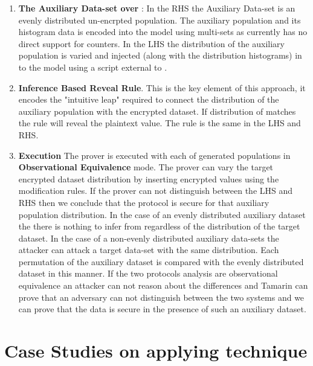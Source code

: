 \documentclass[journal]{IEEEtran}
\begin{document}
\begin{enumerate}[label=(\Alph*)]
\item \textbf{The Auxiliary Data-set \aux{} over \auxSpace}:
In the RHS the Auxiliary Data-set \auxsecure{} is an evenly distributed un-encrpted population.  The auxiliary population and its histogram data is encoded into the model using \tamarin{} multi-sets as \tamarin{} currently has no direct support for counters. 
In the LHS the distribution of the auxiliary population is varied and injected (along with the distribution histograms) in to the model using a script external to \tamarin{}.
\item\textbf{ Inference Based Reveal Rule}. This is the key element of this approach, it encodes the "intuitive leap" required to connect the distribution of the auxiliary population with the encrypted dataset.   If  distribution of \aux{} matches \enc{} the rule will reveal the plaintext value. The rule is the same in the LHS and RHS.
\item \textbf{Execution}
The \tamarin{} prover is executed with each of generated \aux{} populations in \textbf{Observational Equivalence} mode. The prover can vary the target encrypted dataset distribution by inserting encrypted values using the modification rules. If the prover can not distinguish between the LHS and RHS then we conclude that the protocol is secure for that auxiliary population distribution.  In the case of an evenly distributed auxiliary dataset the there is nothing to infer from regardless of the distribution of the target dataset. In the case of a non-evenly distributed auxiliary data-sets the attacker can attack a target data-set with the same distribution. Each permutation of the auxiliary dataset is compared with the evenly distributed dataset in this manner. If the two protocols analysis are observational equivalence an attacker can not reason about the differences and Tamarin can prove that an adversary can not distinguish between the two systems and we can prove that the data is secure in the presence of such an auxiliary dataset.

\end{enumerate}


 
\section{Case Studies on applying technique}
\end{document}
